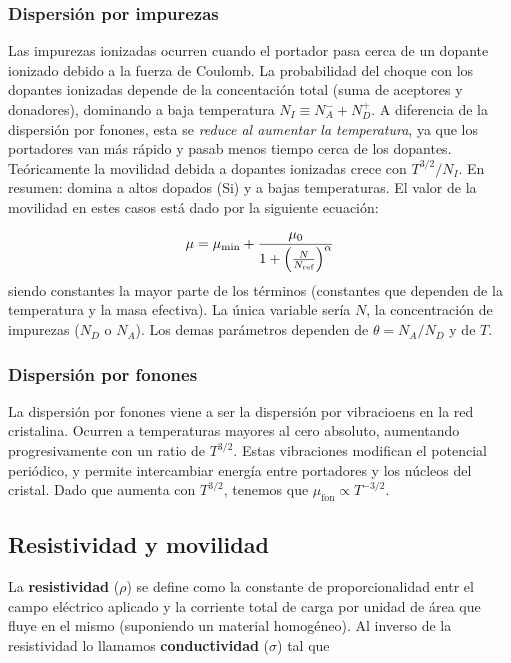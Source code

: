 \subsubsection{Dispersión por impurezas}

Las impurezas ionizadas ocurren cuando el portador pasa cerca de un dopante ionizado debido a la fuerza de Coulomb. La probabilidad del choque con los dopantes ionizadas depende de la concentación total (suma de aceptores y donadores), dominando a baja temperatura $N_I \equiv N_A^- + N_D^+$. A diferencia de la dispersión por fonones, esta se \textit{reduce al aumentar la temperatura}, ya que los portadores van más rápido y pasab menos tiempo cerca de los dopantes. Teóricamente la movilidad debida a dopantes ionizadas crece con $T^{3/2}/N_I$. En resumen: domina a altos dopados (Si) y a bajas temperaturas. El valor de la movilidad en estes casos está dado por la siguiente ecuación: 

\begin{equation}
	\mu = \mu_{\min} + \frac{\mu_0}{1+\left( \frac{N}{N_{\text{ref}}} \right)^{\alpha}}  
\end{equation}
siendo constantes la mayor parte de los términos (constantes que dependen de la temperatura y la masa efectiva). La única variable sería $N$, la concentración de impurezas ($N_D$ o $N_A$). Los demas parámetros dependen de $\theta=N_A/N_D$ y de $T$.

\subsubsection{Dispersión por fonones}

La dispersión por fonones viene a ser la dispersión por vibracioens en la red cristalina. Ocurren a temperaturas mayores al cero absoluto, aumentando progresivamente con un ratio de $T^{3/2}$. Estas vibraciones modifican el potencial periódico, y permite intercambiar energía entre portadores y los núcleos del cristal. Dado que aumenta con $T^{3/2}$, tenemos que $\mu_{\text{fon}} \propto T^{-3/2}$. 


\subsection{Resistividad y movilidad}

La \textbf{resistividad} ($\rho$) se define como la constante de proporcionalidad entr el campo eléctrico aplicado y la corriente total de carga por unidad de área que fluye en el mismo (suponiendo un material homogéneo). Al inverso de la resistividad lo llamamos \textbf{conductividad} ($\sigma$) tal que

